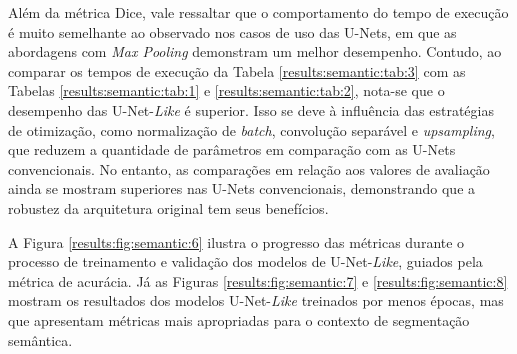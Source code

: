 Além da métrica Dice, vale ressaltar que o comportamento do tempo de execução é muito semelhante ao observado nos casos de uso das U-Nets, em que as abordagens com \textit{Max Pooling} demonstram um melhor desempenho. Contudo, ao comparar os tempos de execução da Tabela \ref{results:semantic:tab:3} com as Tabelas \ref{results:semantic:tab:1} e \ref{results:semantic:tab:2}, nota-se que o desempenho das U-Net-\textit{Like} é superior. Isso se deve à influência das estratégias de otimização, como normalização de \textit{batch}, convolução separável e \textit{upsampling}, que reduzem a quantidade de parâmetros em comparação com as U-Nets convencionais. No entanto, as comparações em relação aos valores de avaliação ainda se mostram superiores nas U-Nets convencionais, demonstrando que a robustez da arquitetura original tem seus benefícios.

A Figura \ref{results:fig:semantic:6} ilustra o progresso das métricas durante o processo de treinamento e validação dos modelos de U-Net-\textit{Like}, guiados pela métrica de acurácia. Já as Figuras \ref{results:fig:semantic:7} e \ref{results:fig:semantic:8} mostram os resultados dos modelos U-Net-\textit{Like} treinados por menos épocas, mas que apresentam métricas mais apropriadas para o contexto de segmentação semântica.

